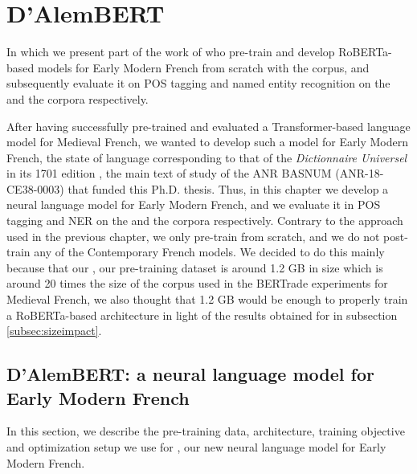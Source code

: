\chapter{D'AlemBERT}\label{chap:dalembert}

\begin{center}
    \begin{minipage}{0.66\textwidth}
        \begin{small}
            In which we present part of the work of \citet{gabay-etal-2022-from} who pre-train and develop RoBERTa-based \citep{liu-etal-2019-roberta} models for Early Modern French from scratch with the \freemmax corpus, and subsequently evaluate it on POS tagging and named entity recognition on the \freemlpm and the \freemner corpora respectively.
        \end{small}
    \end{minipage}
    \vspace{0.5cm}
\end{center}

After having successfully pre-trained and evaluated a Transformer-based language model for Medieval French, we wanted to develop such a model for Early Modern French, the state of language corresponding to that of the \emph{Dictionnaire Universel} in its 1701 edition \citep{furetiere-1701-dictionnaire}, the main text of study of the ANR BASNUM (ANR-18-CE38-0003) that funded this Ph.D. thesis. Thus, in this chapter we develop \dalembert a neural language model for Early Modern French, and we evaluate it in POS tagging and NER on the \freemlpm and the \freemner corpora respectively. Contrary to the approach used in the previous chapter, we only pre-train \dalembert from scratch, and we do not post-train any of the Contemporary French models. We decided to do this mainly because that our \freemmax, our pre-training dataset is around 1.2 GB in size which is around 20 times the size of the corpus used in the BERTrade experiments for Medieval French, we also thought that 1.2 GB would be enough to properly train a RoBERTa-based architecture in light of the results obtained for \camembert in subsection \ref{subsec:sizeimpact}.

\section{D'AlemBERT: a neural language model for Early Modern French}\label{sec:dAlemBERT}
In this section, we describe the pre-training data, architecture, training objective and optimization setup we use for \dalembert, our new neural language model for Early Modern French.

